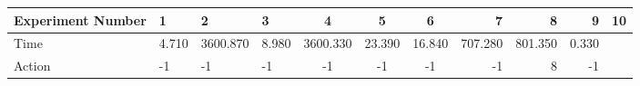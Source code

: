 \documentclass[8pt]{article}
\begin{document}
\begin{landscape}
\begin{tabular}{ | l | l | l | l | c | c | c | r | r | r | r | }
 \hline 
Experiment Number & 1 & 2 & 3 & 4 & 5 & 6 & 7 & 8 & 9 & 10\\ \hline
Time & 4.710 & 3600.870 & 8.980 & 3600.330 & 23.390 & 16.840 & 707.280 & 801.350 & 0.330\\ \hline
Action & -1 & -1 & -1 & -1 & -1 & -1 & -1 & 8 & -1\\ \hline\end{tabular}
\end{landscape}
\end{document}
